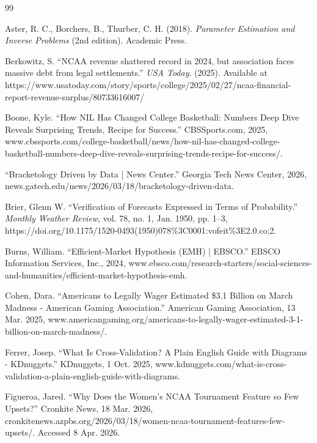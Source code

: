 \documentclass[12pt,leqno]{article}\usepackage[pdftex]{graphicx}\usepackage[dvipsnames]{xcolor}
\theoremstyle{remark}
\begin{document}
\begin{thebibliography}{99}
\singlespacing %
\thispagestyle{empty} %

 Aster, R. C., Borchers, B., Thurber, C. H. (2018). \textit{Parameter Estimation and Inverse Problems} (2nd edition). Academic Press.

 Berkowitz, S. “NCAA revenue shattered record in 2024, but association faces massive debt from legal settlements.” \emph{USA Today}. (2025). Available at https://www.usatoday.com/story/sports/college/2025/02/27/ncaa-financial-report-revenue-surplus/80733616007/

 Boone, Kyle. “How NIL Has Changed College Basketball: Numbers Deep Dive Reveals Surprising Trends, Recipe for Success.” CBSSports.com, 2025, www.cbssports.com/college-basketball/news/how-nil-has-changed-college-basketball-numbers-deep-dive-reveals-surprising-trends-recipe-for-success/.

 “Bracketology Driven by Data | News Center.” Georgia Tech News Center, 2026, news.gatech.edu/news/2026/03/18/bracketology-driven-data.

 Brier, Glenn W. “Verification of Forecasts Expressed in Terms of Probability.” \textit{Monthly Weather Review}, vol. 78, no. 1, Jan. 1950, pp. 1–3, https://doi.org/10.1175/1520-0493(1950)078\%3C0001:vofeit\%3E2.0.co;2.

 Burns, William. “Efficient-Market Hypothesis (EMH) | EBSCO.” EBSCO Information Services, Inc., 2024, www.ebsco.com/research-starters/social-sciences-and-humanities/efficient-market-hypothesis-emh.

 Cohen, Dara. “Americans to Legally Wager Estimated \$3.1 Billion on March Madness - American Gaming Association.” American Gaming Association, 13 Mar. 2025, www.americangaming.org/americans-to-legally-wager-estimated-3-1-billion-on-march-madness/.

 Ferrer, Josep. “What Is Cross-Validation? A Plain English Guide with Diagrams - KDnuggets.” KDnuggets, 1 Oct. 2025, www.kdnuggets.com/what-is-cross-validation-a-plain-english-guide-with-diagrams.

 Figueroa, Jared. “Why Does the Women’s NCAA Tournament Feature so Few Upsets?” Cronkite News, 18 Mar. 2026, cronkitenews.azpbs.org/2026/03/18/women-ncaa-tournament-features-few-upsets/. Accessed 8 Apr. 2026.


\end{thebibliography}
\end{document}

